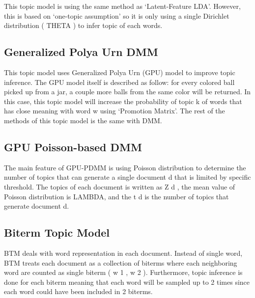 \documentclass[senior]{IPSstyle}
\begin{document}
This topic model is using the same method as ‘Latent-Feature LDA’. However, this is based on ‘one-topic assumption’ so it is only using a single Dirichlet distribution ( THETA ) to
infer topic of each words.

\subsection{Generalized Polya Urn DMM~\cite{li}}

This topic model uses Generalized Polya Urn (GPU) model to improve topic inference. The GPU model itself is described as follow: for every colored ball picked up from a jar, a couple more balls from the same color will be returned. In this case, this topic model will increase the probability of topic k of words that has close meaning with word w using ‘Promotion Matrix’. The rest of the methods of this topic model is the same with DMM.

\subsection{GPU Poisson-based DMM~\cite{li2}}

The main feature of GPU-PDMM is using Poisson distribution to determine the number of topics that can generate a single document d that is limited by specific threshold. The topics of each document is written as Z d , the mean value of Poisson distribution is LAMBDA, and the t d is the number of topics that generate document d.

\subsection{Biterm Topic Model~\cite{cheng}}

BTM deals with word representation in each document. Instead of single word, BTM treats each document as a collection of biterms where each neighboring word are counted as single biterm ( w 1 , w 2 ). Furthermore, topic inference is done for each biterm meaning that each word will be sampled up to 2 times since each word could have been included in 2 biterms.
\end{document}
